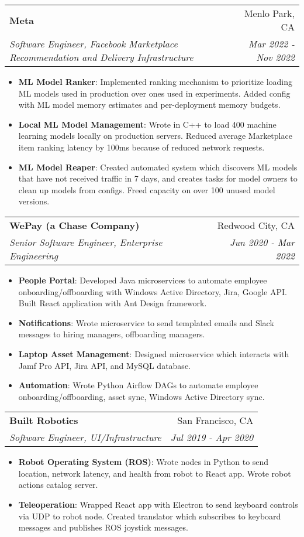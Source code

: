 \documentclass[letterpaper,11pt]{article}
\makeatletter
\newcommand{\resumeItem}[2]{
  \item\small{
    \textbf{#1}{: #2 \vspace{-2pt}}
  }
}
\newcommand{\resumeSubheading}[4]{
  \vspace{-1pt}\item
    \begin{tabular*}{0.97\textwidth}[t]{l@{\extracolsep{\fill}}r}
      \textbf{#1} & #2 \\
      \textit{\small#3} & \textit{\small #4} \\
    \end{tabular*}\vspace{-5pt}
}
\newcommand{\resumeSubSubheading}[2]{
    \begin{tabular*}{0.97\textwidth}{l@{\extracolsep{\fill}}r}
      \textit{\small#1} & \textit{\small #2} \\
    \end{tabular*}\vspace{-5pt}
}
\newcommand{\resumeSubHeadingListEnd}{\end{itemize}}
\newcommand{\resumeItemListStart}{\begin{itemize}}
\newcommand{\resumeItemListEnd}{\end{itemize}\vspace{-5pt}}
\makeatother
\begin{document}
    \resumeSubheading
      {Meta}{Menlo Park, CA}
      {Software Engineer, Facebook Marketplace Recommendation and Delivery Infrastructure}{Mar 2022 - Nov 2022}
      \resumeItemListStart
        \resumeItem{ML Model Ranker}
          {Implemented ranking mechanism to prioritize loading ML models used in production over ones used in experiments. Added config with ML model memory estimates and per-deployment memory budgets.}
        \resumeItem{Local ML Model Management}
          {Wrote in C++ to load 400 machine learning models locally on production servers. Reduced average Marketplace item ranking latency by 100ms because of reduced network requests.}
        \resumeItem{ML Model Reaper}
          {Created automated system which discovers ML models that have not received traffic in 7 days, and creates tasks for model owners to clean up models from configs. Freed capacity on over 100 unused model versions.}
      \resumeItemListEnd

    \resumeSubheading
      {WePay (a Chase Company)}{Redwood City, CA}
      {Senior Software Engineer, Enterprise Engineering}{Jun 2020 - Mar 2022}
      \resumeItemListStart
        \resumeItem{People Portal}
          {Developed Java microservices to automate employee onboarding/offboarding with Windows Active Directory, Jira, Google API. Built React application with Ant Design framework.}
        \resumeItem{Notifications}
          {Wrote microservice to send templated emails and Slack messages to hiring managers, offboarding managers.}
        \resumeItem{Laptop Asset Management}
          {Designed microservice which interacts with Jamf Pro API, Jira API, and MySQL database.}
        \resumeItem{Automation}
          {Wrote Python Airflow DAGs to automate employee onboarding/offboarding, asset sync, Windows Active Directory sync.}
      \resumeItemListEnd

    \resumeSubheading
      {Built Robotics}{San Francisco, CA}
      {Software Engineer, UI/Infrastructure}{Jul 2019 - Apr 2020}
      \resumeItemListStart
        \resumeItem{Robot Operating System (ROS)}
          {Wrote nodes in Python to send location, network latency, and health from robot to React app. Wrote robot actions catalog server.}
        \resumeItem{Teleoperation}
          {Wrapped React app with Electron to send keyboard controls via UDP to robot node. Created translator which subscribes to keyboard messages and publishes ROS joystick messages.}
      \resumeItemListEnd

\end{document}
